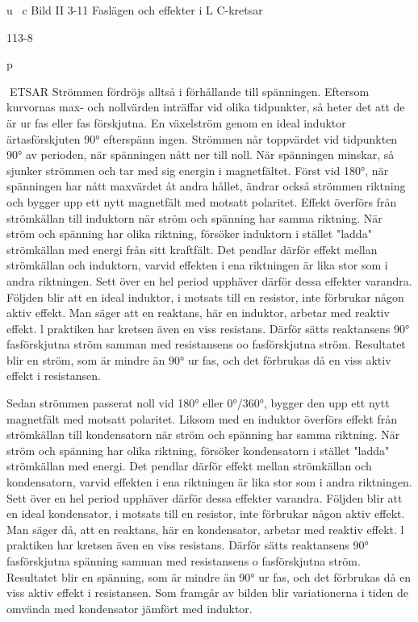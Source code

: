 {u~
c
Bild II 3-11 Faslägen och effekter i L C-kretsar

113-8

p

ETSAR
Strömmen fördröjs alltså i förhållande till
spänningen. Eftersom kurvornas max- och
nollvärden inträffar vid olika tidpunkter, så
heter det att de är ur fas eller fas förskjutna.
En växelström genom en ideal induktor
ärtasförskjuten 90° efterspänn ingen. Strömmen når toppvärdet vid tidpunkten 90° av
perioden, när spänningen nått ner till noll.
När spänningen minskar, så sjunker strömmen och tar med sig energin i magnetfältet.
Först vid 180°, när spänningen har nått maxvärdet åt andra hållet, ändrar också strömmen riktning och bygger upp ett nytt magnetfält med motsatt polaritet.
Effekt överförs från strömkällan till induktorn när ström och spänning har samma riktning. När ström och spänning har olika riktning, försöker induktorn i stället "ladda" strömkällan med energi från sitt kraftfält. Det pendlar därför effekt mellan strömkällan och induktorn, varvid effekten i ena riktningen är
lika stor som i andra riktningen.
Sett över en hel period upphäver därför
dessa effekter varandra. Följden blir att en
ideal induktor, i motsats till en resistor, inte
förbrukar någon aktiv effekt. Man säger att
en reaktans, här en induktor, arbetar med
reaktiv effekt.
l praktiken har kretsen även en viss resistans. Därför sätts reaktansens 90° fasförskjutna ström samman med resistansens oo
fasförskjutna ström. Resultatet blir en ström,
som är mindre än 90° ur fas, och det förbrukas då en viss aktiv effekt i resistansen.

Sedan strömmen passerat noll vid 180° eller
0°/360°, bygger den upp ett nytt magnetfält
med motsatt polaritet.
Liksom med en induktor överförs effekt
från strömkällan till kondensatorn när ström
och spänning har samma riktning. När ström
och spänning har olika riktning, försöker
kondensatorn i stället "ladda" strömkällan
med energi. Det pendlar därför effekt mellan
strömkällan och kondensatorn, varvid effekten i ena riktningen är lika stor som i andra
riktningen.
Sett över en hel period upphäver därför
dessa effekter varandra. Följden blir att en
ideal kondensator, i motsats till en resistor,
inte förbrukar någon aktiv effekt. Man säger
då, att en reaktans, här en kondensator,
arbetar med reaktiv effekt.
l praktiken har kretsen även en viss resistans. Därför sätts reaktansens 90° fasförskjutna spänning samman med resistansens o fasförskjutna ström. Resultatet blir en
spänning, som är mindre än 90° ur fas, och
det förbrukas då en viss aktiv effekt i resistansen. Som framgår av bilden blir variationerna i tiden de omvända med kondensator
jämfört med induktor.

}
